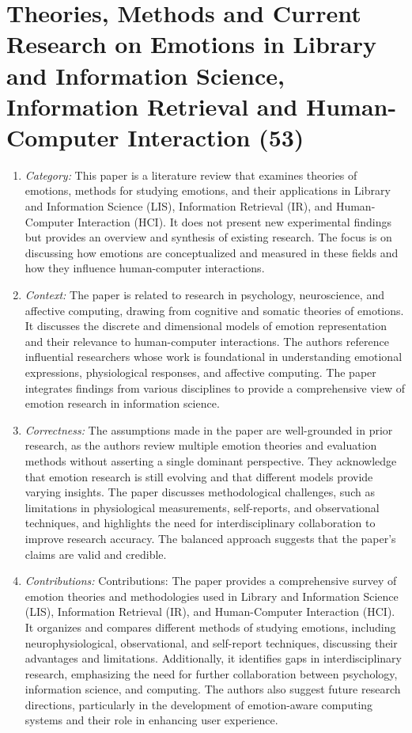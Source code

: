 \newpage
\section[Theories, Methods and Current Research on Emotions in Library and Information Science, Information Retrieval and Human-Computer Interaction (53)]{Theories, Methods and Current Research on Emotions in Library and Information Science, Information Retrieval and Human-Computer Interaction (53) \cite{Lopatovska2011Emotions}}

\begin{enumerate}
    \item \textit{Category:} This paper is a literature review that examines theories of emotions, methods for studying emotions, and their applications in Library and Information Science (LIS), Information Retrieval (IR), and Human-Computer Interaction (HCI). It does not present new experimental findings but provides an overview and synthesis of existing research. The focus is on discussing how emotions are conceptualized and measured in these fields and how they influence human-computer interactions. 
    \item \textit{Context:} The paper is related to research in psychology, neuroscience, and affective computing, drawing from cognitive and somatic theories of emotions. It discusses the discrete and dimensional models of emotion representation and their relevance to human-computer interactions. The authors reference influential researchers whose work is foundational in understanding emotional expressions, physiological responses, and affective computing. The paper integrates findings from various disciplines to provide a comprehensive view of emotion research in information science.
    \item \textit{Correctness: }The assumptions made in the paper are well-grounded in prior research, as the authors review multiple emotion theories and evaluation methods without asserting a single dominant perspective. They acknowledge that emotion research is still evolving and that different models provide varying insights. The paper discusses methodological challenges, such as limitations in physiological measurements, self-reports, and observational techniques, and highlights the need for interdisciplinary collaboration to improve research accuracy. The balanced approach suggests that the paper’s claims are valid and credible.
    \item \textit{Contributions: }Contributions: The paper provides a comprehensive survey of emotion theories and methodologies used in Library and Information Science (LIS), Information Retrieval (IR), and Human-Computer Interaction (HCI). It organizes and compares different methods of studying emotions, including neurophysiological, observational, and self-report techniques, discussing their advantages and limitations. Additionally, it identifies gaps in interdisciplinary research, emphasizing the need for further collaboration between psychology, information science, and computing. The authors also suggest future research directions, particularly in the development of emotion-aware computing systems and their role in enhancing user experience.

\end{enumerate}
